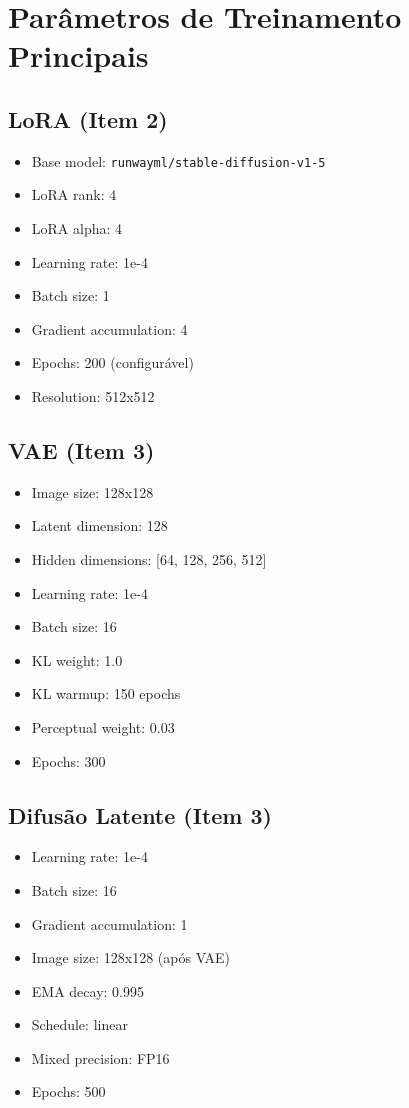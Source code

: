\section{Parâmetros de Treinamento Principais}

\subsection{LoRA (Item 2)}

\begin{itemize}
    \item Base model: \texttt{runwayml/stable-diffusion-v1-5}
    \item LoRA rank: 4
    \item LoRA alpha: 4
    \item Learning rate: 1e-4
    \item Batch size: 1
    \item Gradient accumulation: 4
    \item Epochs: 200 (configurável)
    \item Resolution: 512x512
\end{itemize}

\subsection{VAE (Item 3)}

\begin{itemize}
    \item Image size: 128x128
    \item Latent dimension: 128
    \item Hidden dimensions: [64, 128, 256, 512]
    \item Learning rate: 1e-4
    \item Batch size: 16
    \item KL weight: 1.0
    \item KL warmup: 150 epochs
    \item Perceptual weight: 0.03
    \item Epochs: 300
\end{itemize}

\subsection{Difusão Latente (Item 3)}

\begin{itemize}
    \item Learning rate: 1e-4
    \item Batch size: 16
    \item Gradient accumulation: 1
    \item Image size: 128x128 (após VAE)
    \item EMA decay: 0.995
    \item Schedule: linear
    \item Mixed precision: FP16
    \item Epochs: 500
\end{itemize}

